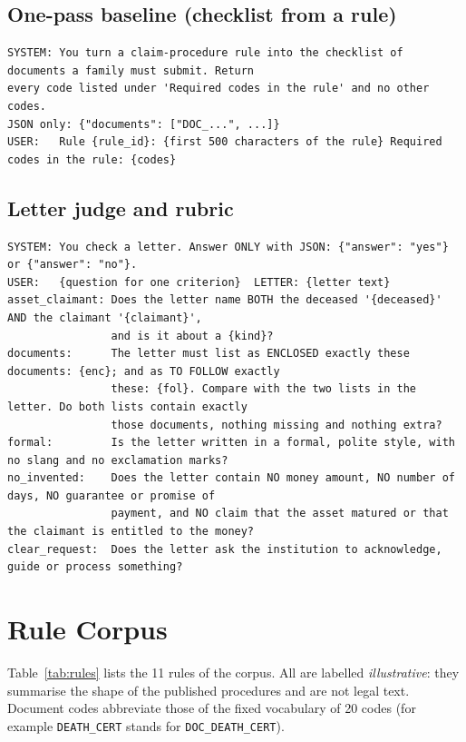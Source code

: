 \documentclass[12pt,a4paper,oneside]{report}
\begin{document}
\section{One-pass baseline (checklist from a rule)}
\begin{lstlisting}[numbers=none,basicstyle=\ttfamily\scriptsize\setstretch{1.0},breaklines=true]
SYSTEM: You turn a claim-procedure rule into the checklist of documents a family must submit. Return
every code listed under 'Required codes in the rule' and no other codes.
JSON only: {"documents": ["DOC_...", ...]}
USER:   Rule {rule_id}: {first 500 characters of the rule} Required codes in the rule: {codes}
\end{lstlisting}

\newpage
\section{Letter judge and rubric}
\begin{lstlisting}[numbers=none,basicstyle=\ttfamily\scriptsize\setstretch{1.0},breaklines=true]
SYSTEM: You check a letter. Answer ONLY with JSON: {"answer": "yes"} or {"answer": "no"}.
USER:   {question for one criterion}  LETTER: {letter text}
asset_claimant: Does the letter name BOTH the deceased '{deceased}' AND the claimant '{claimant}',
                and is it about a {kind}?
documents:      The letter must list as ENCLOSED exactly these documents: {enc}; and as TO FOLLOW exactly
                these: {fol}. Compare with the two lists in the letter. Do both lists contain exactly
                those documents, nothing missing and nothing extra?
formal:         Is the letter written in a formal, polite style, with no slang and no exclamation marks?
no_invented:    Does the letter contain NO money amount, NO number of days, NO guarantee or promise of
                payment, and NO claim that the asset matured or that the claimant is entitled to the money?
clear_request:  Does the letter ask the institution to acknowledge, guide or process something?
\end{lstlisting}

\chapter{Rule Corpus}\label{app:rules}
Table~\ref{tab:rules} lists the 11 rules of the corpus. All are labelled \emph{illustrative}: they summarise the shape of the published procedures and are not legal text. Document codes abbreviate those of the fixed vocabulary of 20 codes (for example \texttt{DEATH\_CERT} stands for \texttt{DOC\_DEATH\_CERT}).
\end{document}
